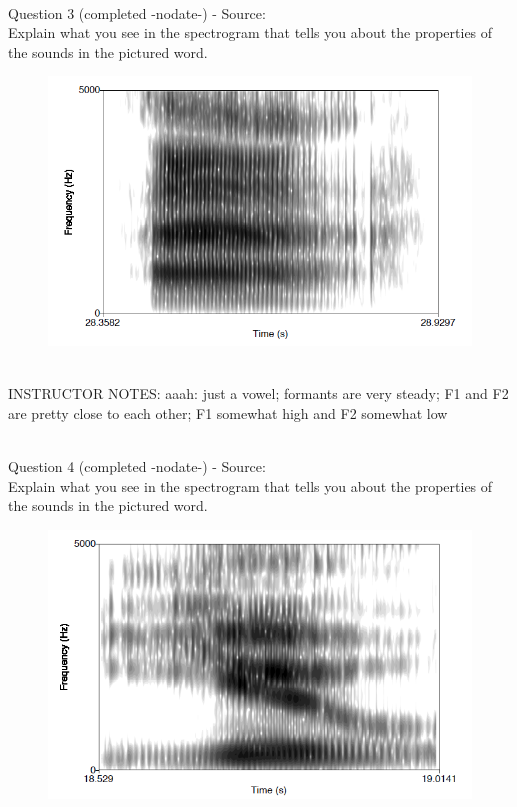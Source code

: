 \documentclass[12pt]{article}
\begin{document}
~\\

{\large Question 3} (completed -nodate-) - Source: \\

Explain what you see in the spectrogram that tells you about the properties of the sounds in the pictured word.\\

\begin{figure}[H]
\includegraphics{../images/spectrogram_aaah.png}
\end{figure}

~\\
INSTRUCTOR NOTES: aaah: just a vowel; formants are very steady; F1 and F2 are pretty close to each other; F1 somewhat high and F2 somewhat low


~\\

{\large Question 4} (completed -nodate-) - Source: \\

Explain what you see in the spectrogram that tells you about the properties of the sounds in the pictured word.\\

\begin{figure}[H]
\includegraphics{../images/spectrogram_you.png}
\end{figure}
\end{document}

